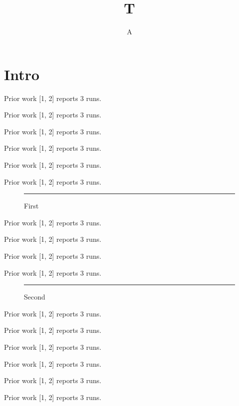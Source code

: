 \documentclass[titlepage]{article}
\title{T}\author{A}
\newcommand\para[1]{\lipsum[#1] Prior work [1, 2] reports 3 runs.\par}
\begin{document}
\maketitle
\section{Intro}
\para{1}\para{2}\para{3}\para{4}\para{5}\para{6}
\begin{figure}[t]\centering\rule{4cm}{3cm}\caption{First}\label{fig:a}\end{figure}
\para{7}\para{8}\para{9}\para{10}
\begin{figure}[t]\centering\rule{4cm}{3cm}\caption{Second}\label{fig:b}\end{figure}
\para{11}\para{12}\para{13}\para{14}\para{15}\para{16}
\end{document}
